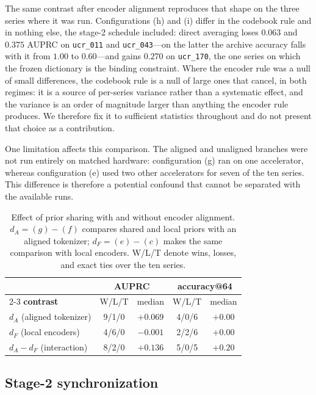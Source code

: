 \documentclass[conference]{IEEEtran}
\begin{document}
The same contrast after encoder alignment reproduces that shape on the three series where it was
run. Configurations (h) and (i) differ in the codebook rule and in nothing else, the stage-2
schedule included: direct averaging loses $0.063$ and $0.375$ AUPRC on \texttt{ucr\_011} and
\texttt{ucr\_043}---on the latter the archive accuracy falls with it from $1.00$ to $0.60$---and
gains $0.270$ on \texttt{ucr\_170}, the one series on which the frozen dictionary is the binding
constraint. Where the encoder rule was a null of small differences, the codebook rule is a null of
large ones that cancel, in both regimes: it is a source of per-series variance rather than a
systematic effect, and the variance is an order of magnitude larger than anything the encoder rule
produces. We therefore fix it to sufficient statistics throughout and do not present that choice as
a contribution.

One limitation affects this comparison. The aligned and unaligned branches were not run entirely on matched hardware: configuration (g) ran on one accelerator, whereas configuration (e) used two other accelerators for seven of the ten series. This difference is therefore a potential confound that cannot be separated with the available runs.

\begin{table}[t]
\caption{Effect of prior sharing with and without encoder alignment. $d_A=(g)-(f)$ compares shared and local priors with an aligned tokenizer; $d_F=(e)-(c)$ makes the same comparison with local encoders. W/L/T denote wins, losses, and exact ties over the ten series.}
\label{tab:ablation}
\centering
\scriptsize
\setlength{\tabcolsep}{4pt}
\renewcommand{\arraystretch}{1.1}
\begin{tabular}{@{}l cc cc@{}}
\hline
& \multicolumn{2}{c}{\textbf{AUPRC}} & \multicolumn{2}{c}{\textbf{accuracy@64}} \\
\cline{2-3}\cline{4-5}
\textbf{contrast} & W/L/T & median & W/L/T & median \\
\hline
$d_A$ (aligned tokenizer) & 9/1/0 & $+0.069$ & 4/0/6 & $+0.00$ \\
$d_F$ (local encoders) & 4/6/0 & $-0.001$ & 2/2/6 & $+0.00$ \\
\hline
$d_A-d_F$ (interaction) & 8/2/0 & $+0.136$ & 5/0/5 & $+0.20$ \\
\hline
\end{tabular}
\end{table}

\subsection{Stage-2 synchronization}
\label{subsec:stage2}
\end{document}
